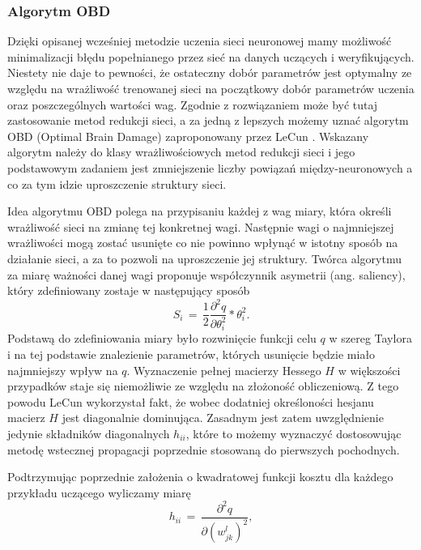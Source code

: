 \subsubsection{Algorytm OBD}
\par Dzięki opisanej wcześniej metodzie uczenia sieci neuronowej mamy możliwość minimalizacji błędu popełnianego przez sieć na danych uczących i weryfikujących. Niestety nie daje to pewności, że ostateczny dobór parametrów jest optymalny ze względu na wrażliwość trenowanej sieci na początkowy dobór parametrów uczenia oraz poszczególnych wartości wag. Zgodnie z \cite{osowski2013} rozwiązaniem może być tutaj zastosowanie metod redukcji sieci, a za jedną z lepszych możemy uznać algorytm OBD (Optimal Brain Damage) zaproponowany przez LeCun \cite{lecun1989}. Wskazany algorytm należy do klasy wrażliwościowych metod redukcji sieci i jego podstawowym zadaniem jest zmniejszenie liczby powiązań między-neuronowych a co za tym idzie uproszczenie struktury sieci. 
\par Idea algorytmu OBD polega na przypisaniu każdej z wag miary, która określi wrażliwość sieci na zmianę tej konkretnej wagi. Następnie wagi o najmniejszej wrażliwości mogą zostać usunięte co nie powinno wpłynąć w istotny sposób na działanie sieci, a za to pozwoli na uproszczenie jej struktury. Twórca algorytmu za miarę ważności danej wagi proponuje współczynnik asymetrii (ang. saliency), który zdefiniowany zostaje w następujący sposób
\begin{equation}
S_i \, = \, \frac{1}{2} \frac{\partial^2q}{\partial \theta_i^2} * \theta_i^2 .
\end{equation} 
Podstawą do zdefiniowania miary było rozwinięcie funkcji celu \(q\) w szereg Taylora i na tej podstawie znalezienie parametrów, których usunięcie będzie miało najmniejszy wpływ na  \(q\). Wyznaczenie pełnej macierzy Hessego \(H\) w większości przypadków staje się niemożliwie ze względu na złożoność obliczeniową. Z tego powodu LeCun wykorzystał fakt, że wobec dodatniej określoności hesjanu macierz \(H\) jest diagonalnie dominująca. Zasadnym jest zatem uwzględnienie jedynie składników diagonalnych \( h_{ii} \), które to możemy wyznaczyć dostosowując metodę wstecznej propagacji poprzednie stosowaną do pierwszych pochodnych. 
\par Podtrzymując poprzednie założenia o kwadratowej funkcji kosztu dla każdego przykładu uczącego wyliczamy miarę
\begin{equation}
h_{ii} \, = \, \frac{\partial^2q}{\partial (w_{jk}^l)^2}, 
\end{equation}  
